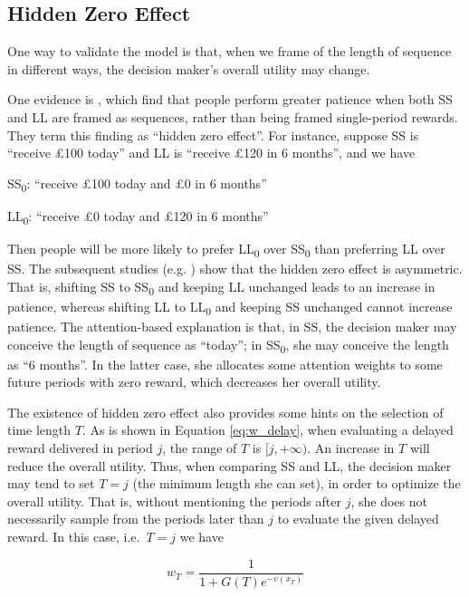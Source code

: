 \documentclass[
  12pt,
]{article}
\begin{document}
\hypertarget{hidden-zero-effect}{%
\subsection{Hidden Zero Effect}\label{hidden-zero-effect}}

One way to validate the model is that, when we frame of the length of
sequence in different ways, the decision maker's overall utility may
change.

One evidence is \citet{magen_hidden-zero_2008}, which find that people
perform greater patience when both SS and LL are framed as sequences,
rather than being framed single-period rewards. They term this finding
as ``hidden zero effect''. For instance, suppose SS is ``receive £100
today'' and LL is ``receive £120 in 6 months'', and we have

SS\textsubscript{0}: ``receive £100 today and £0 in 6 months''

LL\textsubscript{0}: ``receive £0 today and £120 in 6 months''

Then people will be more likely to prefer LL\textsubscript{0} over
SS\textsubscript{0} than preferring LL over SS. The subsequent studies
(e.g. \citet{read_value_2017}) show that the hidden zero effect is
asymmetric. That is, shifting SS to SS\textsubscript{0} and keeping LL
unchanged leads to an increase in patience, whereas shifting LL to
LL\textsubscript{0} and keeping SS unchanged cannot increase patience.
The attention-based explanation is that, in SS, the decision maker may
conceive the length of sequence as ``today''; in SS\textsubscript{0},
she may conceive the length as ``6 months''. In the latter case, she
allocates some attention weights to some future periods with zero
reward, which decreases her overall utility.

The existence of hidden zero effect also provides some hints on the
selection of time length \(T\). As is shown in Equation
\ref{eq:w_delay}, when evaluating a delayed reward delivered in period
\(j\), the range of \(T\) is \([j,+\infty)\). An increase in \(T\) will
reduce the overall utility. Thus, when comparing SS and LL, the decision
maker may tend to set \(T=j\) (the minimum length she can set), in order
to optimize the overall utility. That is, without mentioning the periods
after \(j\), she does not necessarily sample from the periods later than
\(j\) to evaluate the given delayed reward. In this case, i.e.~\(T=j\)
we have

\[
w_T = \frac{1}{1+G(T)e^{-v(x_T)}}
\]
\end{document}
